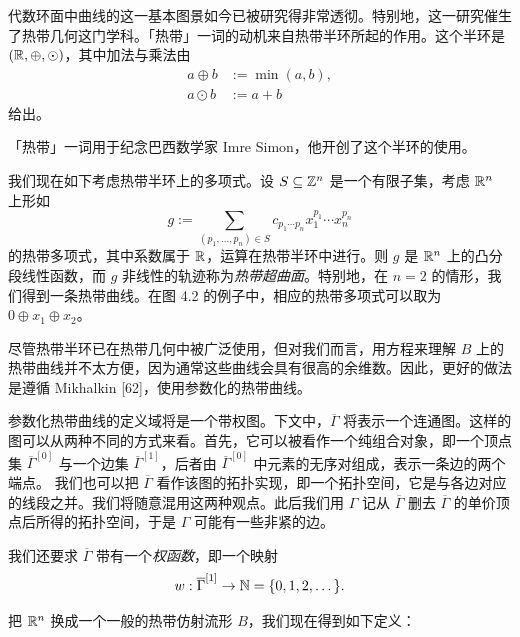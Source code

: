 
代数环面中曲线的这一基本图景如今已被研究得非常透彻。特别地，这一研究催生了热带几何这门学科。「热带」一词的动机来自热带半环所起的作用。这个半环是 $(\mathbb{R},\oplus,\odot)$，其中加法与乘法由
\begin{align*}
a\oplus b&:=\min(a,b),\\
a\odot b&:=a+b
\end{align*}
给出。

「热带」一词用于纪念巴西数学家 Imre Simon，他开创了这个半环的使用。

我们现在如下考虑热带半环上的多项式。设 $S\subseteq\mathbb{Z}^n$ 是一个有限子集，考虑 $\mathbb{R}^n$ 上形如
\[
g:=\sum_{(p_1,\dots,p_n)\in S}c_{p_1\cdots p_n}x_1^{p_1}\cdots x_n^{p_n}
\]
的热带多项式，其中系数属于 $\mathbb{R}$，运算在热带半环中进行。则 $g$ 是 $\mathbb{R}^n$ 上的凸分段线性函数，而 $g$ 非线性的轨迹称为\emph{热带超曲面}。特别地，在 $n=2$ 的情形，我们得到一条热带曲线。在图 4.2 的例子中，相应的热带多项式可以取为 $0\oplus x_1\oplus x_2$。

尽管热带半环已在热带几何中被广泛使用，但对我们而言，用方程来理解 $B$ 上的热带曲线并不太方便，因为通常这些曲线会具有很高的余维数。因此，更好的做法是遵循 Mikhalkin [62]，使用参数化的热带曲线。

参数化热带曲线的定义域将是一个带权图。下文中，$\overline{\Gamma}$ 将表示一个连通图。这样的图可以从两种不同的方式来看。首先，它可以被看作一个纯组合对象，即一个顶点集 $\overline{\Gamma}^{[0]}$ 与一个边集 $\overline{\Gamma}^{[1]}$，后者由 $\overline{\Gamma}^{[0]}$ 中元素的无序对组成，表示一条边的两个端点。
我们也可以把 $\overline{\Gamma}$ 看作该图的拓扑实现，即一个拓扑空间，它是与各边对应的线段之并。我们将随意混用这两种观点。此后我们用 $\Gamma$ 记从 $\overline{\Gamma}$ 删去 $\overline{\Gamma}$ 的单价顶点后所得的拓扑空间，于是 $\Gamma$ 可能有一些非紧的边。

我们还要求 $\overline{\Gamma}$ 带有一个\emph{权函数}，即一个映射
\[
w:\overline{\Gamma}^{[1]}\to\mathbb{N}=\{0,1,2,\dots\}.
\]

把 $\mathbb{R}^n$ 换成一个一般的热带仿射流形 $B$，我们现在得到如下定义：

